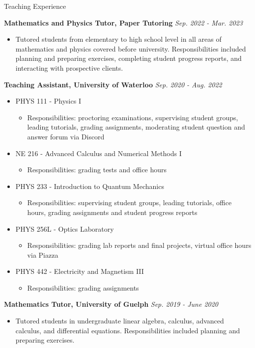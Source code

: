 \documentclass{resume} %
\begin{document}
\begin{rSection}{Teaching Experience}

{\bf{Mathematics and Physics Tutor, Paper Tutoring}}
\hfill\textit{{Sep. 2022 - Mar. 2023}}
\begin{itemize}
\item Tutored students from elementary to high school level in all areas of mathematics and physics covered before university. Responsibilities included planning and preparing exercises, completing student progress reports, and interacting with prospective clients.
\end{itemize}

{\bf{Teaching Assistant, University of Waterloo}}
\hfill\textit{{Sep. 2020 - Aug. 2022}}
\begin{itemize}
\item PHYS 111 - Physics I
    \begin{itemize}
    \item Responsibilities: proctoring examinations, supervising student groups, leading tutorials, grading assignments, moderating student question and answer forum via Discord
    \end{itemize}    
\item NE 216 - Advanced Calculus and Numerical Methods I
    \begin{itemize}
    \item Responsibilities: grading tests and office hours
    \end{itemize}
\item PHYS 233 - Introduction to Quantum Mechanics
    \begin{itemize}
    \item Responsibilities: supervising student groups, leading tutorials, office hours, grading assignments and student progress reports
    \end{itemize}
\item PHYS 256L - Optics Laboratory
    \begin{itemize}
    \item Responsibilities: grading lab reports and final projects, virtual office hours via Piazza
    \end{itemize}
\item PHYS 442 - Electricity and Magnetism III
    \begin{itemize}
    \item Responsibilities: grading assignments
    \end{itemize}    
\end{itemize}

{\bf{Mathematics Tutor, University of Guelph}}
\hfill\textit{{Sep. 2019 - June 2020}}
\begin{itemize}
\item Tutored students in undergraduate linear algebra, calculus, advanced calculus, and differential equations. Responsibilities included planning and preparing exercises.
\end{itemize}

\end{rSection}
\end{document}

